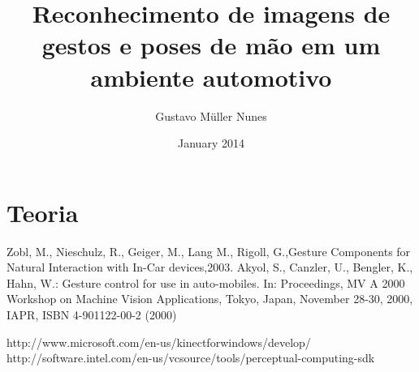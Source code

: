 \documentclass[a4paper,11pt,oneside]{book}
\begin{document}
\author{Gustavo Müller Nunes}
\title{Reconhecimento de imagens de gestos e poses de mão em um ambiente automotivo}
\date{January 2014}

\maketitle
\tableofcontents 	%
\listoftables 		%
\listoffigures 		%


\chapter{Teoria}




\begin{thebibliography}{2}
 
 Zobl, M., Nieschulz, R., Geiger, M., Lang M., Rigoll, G.,{Gesture Components for Natural Interaction with In-Car devices},2003.
 Akyol, S., Canzler, U., Bengler, K., Hahn, W.: Gesture control for use in auto-mobiles. In: Proceedings, MV A 2000 Workshop on Machine Vision Applications, Tokyo, Japan, November 28-30, 2000, IAPR, ISBN 4-901122-00-2 (2000)
 
 http://www.microsoft.com/en-us/kinectforwindows/develop/
http://software.intel.com/en-us/vcsource/tools/perceptual-computing-sdk

\end{thebibliography}
\end{document}

